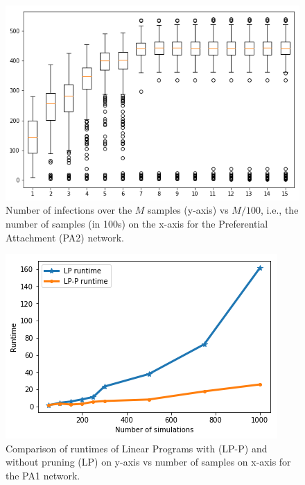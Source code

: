 \begin{figure}[!h]
    \centering
    \includegraphics[scale = 0.4]{Figuresnew/boxplotpa.png}
    \caption{Number of infections over the $M$ samples (y-axis) vs $M/100$, i.e., the number of samples (in 100s) on the x-axis
for the Preferential Attachment (PA2) network.
}
    \label{fig:pa_boxplot}
\end{figure}


\begin{figure}[!h]
    \centering
    \includegraphics[scale = 0.52]{Figuresnew/pa1_runtime}
    \caption{Comparison of runtimes of Linear Programs with (LP-P) and without pruning (LP) on y-axis vs 
number of samples on x-axis for the PA1 network. }
    \label{fig:pa1pruningtime}
\end{figure}



